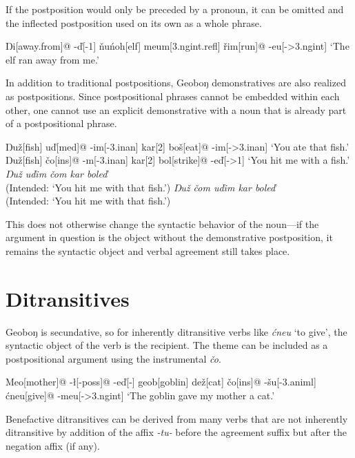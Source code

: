 \documentclass[a4paper,11pt,oneside,openany]{memoir}
\newcommand{\vd}{ď}
\newcommand{\vc}{č}
\newcommand{\vz}{ž}
\newcommand{\vs}{š}
\newcommand{\vr}{ř}
\newcommand{\vn}{ň}
\newcommand{\Engma}{Ŋ}
\newcommand{\engma}{ŋ}
\begin{document}
If the postposition would only be preceded by a pronoun, it can be omitted and the inflected postposition used on its own as a whole phrase.

\ex 
\begingl 
\Engma i[away.from]@
-\vd[-1]
\vn u\'noh[elf]
meum[{\sc 3.ngint.refl}]
\vr im[run]@
-eu[-{\sc >3.ngint}]
\glft `The elf ran away from me.'
\endgl
\xe

In addition to traditional postpositions, Geobo{\engma} demonstratives are also realized as postpositions. Since postpositional phrases cannot be embedded within each other, one cannot use an explicit demonstrative with a noun that is already part of a postpositional phrase.

\pex
\a
\begingl
\Engma u{\vz}[fish]
u\vd[{\sc med}]@
-im[-{\sc 3.inan}]
kar[2]
bo\vs[eat]@
-im[-{\sc >3.inan}]
\glft `You ate that fish.'
\endgl
\a 
\begingl 
\Engma u\vz[fish]
\vc o[{\sc ins}]@
-m[-{\sc 3.inan}]
kar[2]
bol[strike]@
-e\vd[-{\sc >1}]
\glft `You hit me with a fish.'
\endgl
\a \ljudge* \textit{\Engma u{\vz} u\vd im \vc om kar bole\vd} \\
(Intended: `You hit me with that fish.')
\a \ljudge* \textit{\Engma u{\vz} \vc om u\vd im kar bole\vd} \\
(Intended: `You hit me with that fish.')
\xe

This does not otherwise change the syntactic behavior of the noun---if the argument in question is the object without the demonstrative postposition, it remains the syntactic object and verbal agreement still takes place.

\section{Ditransitives}

Geobo{\engma} is secundative, so for inherently ditransitive verbs like \textit{\'cneu} `to give', the syntactic object of the verb is the recipient. The theme can be included as a postpositional argument using the instrumental \textit{\vc o}.

\ex
\begingl
Meo[mother]@
-\l[-{\sc poss}]@
-e{\vd}[-{}]
geob[goblin]
de{\vz}[cat]
\vc o[{\sc ins}]@
-\vs u[-{\sc 3.animl}]
\'cneu[give]@
-meu[-{\sc >3.ngint}]
\glft `The goblin gave my mother a cat.'
\endgl
\xe

Benefactive ditransitives can be derived from many verbs that are not inherently ditransitive by addition of the affix \textit{-tu-} before the agreement suffix but after the negation affix (if any).
\end{document}

